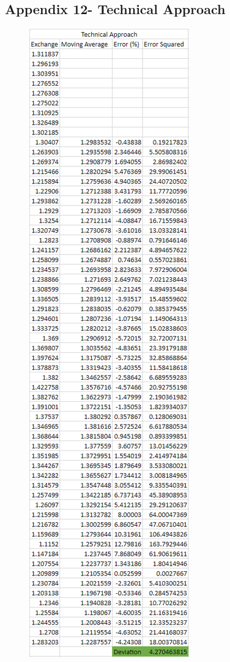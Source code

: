 \documentclass{article}
\let\Oldsubsection\subsection
\renewcommand{\subsection}{\FloatBarrier\Oldsubsection}
\begin{document}
\subsection*{Appendix 12- Technical Approach}
\begin{figure}[h!]
    \centering
    \includegraphics[scale=0.5]{graphs/app12.png}
\end{figure}
\end{document}
